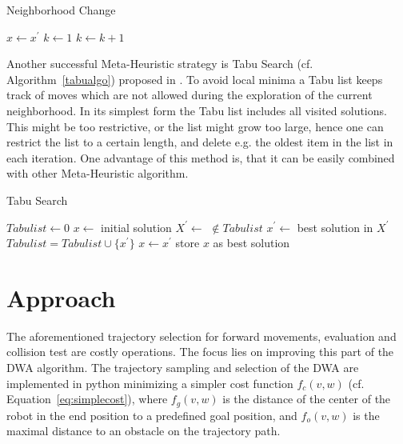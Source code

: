 \begin{algorithm}
\caption{Neighborhood Change}
\label{changealgo}
\begin{algorithmic}
    \State $x\gets x^\prime$
    \State $k\gets 1$
\Else
    \State $k\gets k+1$
\EndIf

\EndFunction
\end{algorithmic}
\end{algorithm}


Another successful Meta-Heuristic strategy is Tabu Search (cf. Algorithm~\ref{tabualgo}) proposed in \cite{glover1999tabu}. 
To avoid local minima a Tabu list keeps track of moves which are not allowed during the exploration of the current neighborhood. 
In its simplest form the Tabu list includes all visited solutions. 
This might be too restrictive, or the list might grow too large, hence one can restrict the list to a certain length, and delete e.g. the oldest item in the list in each iteration. 
One advantage of this method is, that it can be easily combined with other Meta-Heuristic algorithm.

\begin{algorithm}
\caption{Tabu Search}
\label{tabualgo}
\begin{algorithmic}
\State $Tabulist \gets 0$
\State $x\gets$ initial solution
\Repeat
 \State $X^\prime \gets$  $\not\in Tabulist$
 \State $x^\prime \gets$ best solution in $X^\prime$
 \State $Tabulist = Tabulist \cup \{x^\prime\}$
 \State $x \gets x^\prime$
   \State store $x$ as best solution
 \EndIf
{}
\end{algorithmic}
\end{algorithm}


\section{Approach} \label{sec:Approach}
The aforementioned trajectory selection for forward movements, evaluation and collision test are costly operations. 
The focus lies on improving this part of the DWA algorithm. 
The trajectory sampling and selection of the DWA are implemented in python minimizing a simpler cost function $f_c(v,w)$ (cf. Equation~\ref{eq:simplecost}), where $f_g(v,w)$ is the distance of the center of the robot in the end position to a predefined goal position, and $f_o(v,w)$ is the maximal distance to an obstacle on the trajectory path.

